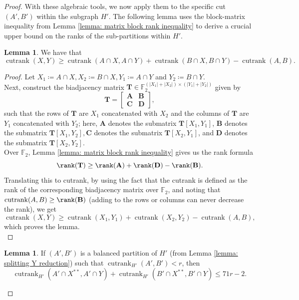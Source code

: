 \documentclass{article}
\theoremstyle{definition}
\newtheorem{lemma}[theorem]{Lemma}
\begin{document}
\begin{proof}
 With these algebraic tools, we now apply them to the specific cut $(A', B')$ within the subgraph $H'$. The following lemma uses the block-matrix inequality from Lemma \ref{lemma: matrix block rank inequality} to derive a crucial upper bound on the ranks of the sub-partitions within $H'$.\\

\begin{lemma} We have that \[\operatorname{cutrank}(X,Y)\geq \operatorname{cutrank}(A\cap X,A\cap Y) + \operatorname{cutrank}(B\cap X,  B\cap Y) - \operatorname{cutrank}(A, B).\]\label{helper lemma}
\end{lemma}
\begin{proof}

Let $X_1\coloneqq A\cap X, X_2\coloneqq B\cap X, Y_1\coloneqq A\cap Y$ and $Y_2\coloneqq B\cap Y$. \\

Next, construct the biadjacency matrix $\mathbf{T} \in \mathbb{F}_2^{(|X_1|+|X_2|)\times (|Y_1| + |Y_2|)}$ given by \[\mathbf{T} = \begin{bmatrix}
    \mathbf{A} & \mathbf{B} \\ \mathbf{C} &  \mathbf{D}
\end{bmatrix},\]
such that the rows of $\mathbf{T}$ are $X_1$ concatenated with $X_2$ and the columns of $\mathbf{T}$ are $Y_1$ concatenated with $Y_2$; here, $\mathbf{A}$ denotes the submatrix $\mathbf{T}[X_1, Y_1]$, $\mathbf{B}$ denotes the submatrix $\mathbf{T}[X_1, Y_2], \mathbf{C}$ denotes the submatrix $\mathbf{T}[X_2, Y_1]$, and $\mathbf{D}$ denotes the submatrix $\mathbf{T}[X_2, Y_2]$. \\

Over $\mathbb{F}_2$, Lemma \ref{lemma: matrix block rank inequality} gives us the rank formula \[\rank(\mathbf{T}) \geq \rank(\mathbf{A}) + \rank(\mathbf{D}) - \rank(\mathbf{B}).\] Translating this to cutrank, by using the fact that the cutrank is defined as the rank of the corresponding biadjacency matrix over $\mathbb{F}_2$, and noting that $\operatorname{cutrank}(A,B) \geq \rank(\mathbf{B})$ (adding to the rows or columns can never decrease the rank), we get \[\operatorname{cutrank}(X,Y)\geq \operatorname{cutrank}(X_1, Y_1) + \operatorname{cutrank}(X_2, 
Y_2) - \operatorname{cutrank}(A,B),\] which proves the lemma.\qedhere\\
\end{proof}

\begin{lemma}\label{lemma: second_condition}
If $(A',B')$ is a balanced partition of $H'$ (from Lemma \ref{lemma: splitting Y reduction}) such that $\operatorname{cutrank}_{H'}(A',B') < r$, then \[\operatorname{cutrank}_{H'}(A' \cap X^{**}, A' \cap Y) + \operatorname{cutrank}_{H'}(B'\cap X^{**}, B' \cap Y) \leq 71r - 2.\]
\end{lemma}


\end{proof}
\end{document}
